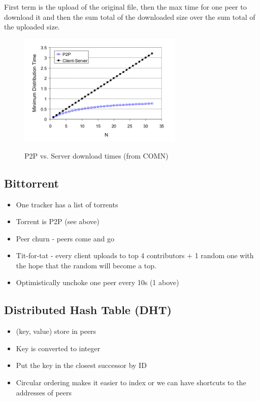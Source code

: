 \documentclass{article}
\begin{document}
First term is the upload of the original file, then the max time for one peer to download it and then the sum total of the downloaded size over the sum total of the uploaded size.

\begin{figure}
    \centering
    \includegraphics[width=0.7\textwidth]{figures/p2p.png}
    \label{fig:download}
    \caption{P2P vs. Server download times (from COMN)}
\end{figure}

\subsection{Bittorrent}
\begin{itemize}
    \item One tracker has a list of torrents
    \item Torrent is P2P (see above)
    \item Peer churn - peers come and go
    \item Tit-for-tat - every client uploads to top 4 contributors + 1 random one with the hope that the random will become a top.
    \item Optimistically unchoke one peer every 10s (1 above)
\end{itemize}

\subsection{Distributed Hash Table (DHT)}
\begin{itemize}
    \item (key, value) store in peers
    \item Key is converted to integer
    \item Put the key in the closest successor by ID
    \item Circular ordering makes it easier to index or we can have shortcuts to the addresses of peers
\end{itemize}
\end{document}
